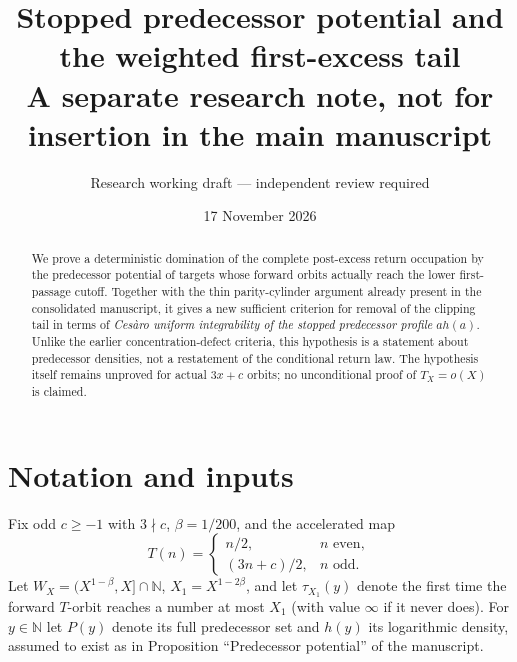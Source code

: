 \documentclass[11pt,a4paper]{article}
\title{Stopped predecessor potential and the weighted first-excess tail\\\large A separate research note, not for insertion in the main manuscript}
\author{Research working draft --- independent review required}
\date{17 November 2026}
\newcommand{\NN}{\mathbb N}
\newcommand{\1}{\mathbf 1}
\begin{document}
\maketitle
\begin{abstract}
We prove a deterministic domination of the complete post-excess return occupation by the predecessor potential of targets whose forward orbits actually reach the lower first-passage cutoff. Together with the thin parity-cylinder argument already present in the consolidated manuscript, it gives a new sufficient criterion for removal of the clipping tail in terms of \emph{Ces\`aro uniform integrability of the stopped predecessor profile} $a h(a)$. Unlike the earlier concentration-defect criteria, this hypothesis is a statement about predecessor densities, not a restatement of the conditional return law. The hypothesis itself remains unproved for actual $3x+c$ orbits; no unconditional proof of $T_X=o(X)$ is claimed.
\end{abstract}

\section{Notation and inputs}
Fix odd $c\ge-1$ with $3\nmid c$, $\beta=1/200$, and the accelerated map
\[
 T(n)=\begin{cases} n/2,&n\text{ even},\\(3n+c)/2,&n\text{ odd}.\end{cases}
\]
Let $W_X=(X^{1-\beta},X]\cap\NN$, $X_1=X^{1-2\beta}$, and let $\tau_{X_1}(y)$ denote the first time the forward $T$-orbit reaches a number at most $X_1$ (with value $\infty$ if it never does). For $y\in\NN$ let $P(y)$ denote its full predecessor set and $h(y)$ its logarithmic density, assumed to exist as in Proposition ``Predecessor potential'' of the manuscript.
\end{document}
